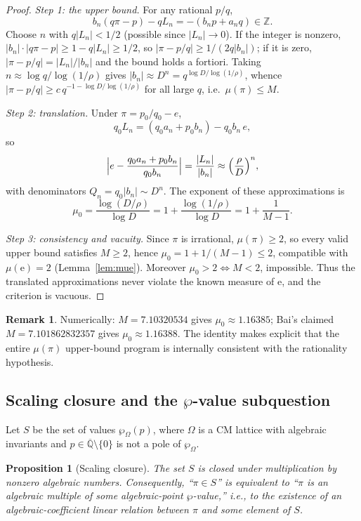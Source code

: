 \documentclass[11pt]{amsart}
\newtheorem{proposition}[theorem]{Proposition}
\theoremstyle{definition}
\newtheorem{remark}[theorem]{Remark}
\theoremstyle{remark}
\numberwithin{equation}{section}
\newcommand{\Z}{\mathbb{Z}}
\newcommand{\Qbar}{\overline{\mathbb{Q}}}
\newcommand{\irr}{\mu}
\newcommand{\ee}{\mathrm{e}}
\begin{document}
\begin{proof}
\emph{Step 1: the upper bound.} For any rational $p/q$,
\[
b_n(q\pi-p)-qL_n=-(b_np+a_nq)\in\Z.
\]
Choose $n$ with $q|L_n|<1/2$ (possible since $|L_n|\to0$). If the integer is nonzero, $|b_n|\cdot|q\pi-p|\ge1-q|L_n|\ge1/2$, so $|\pi-p/q|\ge1/(2q|b_n|)$; if it is zero, $|\pi-p/q|=|L_n|/|b_n|$ and the bound holds a fortiori. Taking $n\approx\log q/\log(1/\rho)$ gives $|b_n|\approx D^n=q^{\log D/\log(1/\rho)}$, whence $|\pi-p/q|\ge c\,q^{-1-\log D/\log(1/\rho)}$ for all large $q$, i.e.\ $\irr(\pi)\le M$.

\emph{Step 2: translation.} Under $\pi=p_0/q_0-e$,
\[
q_0L_n=(q_0a_n+p_0b_n)-q_0b_n\,e,
\]
so
\[
\Bigl|e-\frac{q_0a_n+p_0b_n}{q_0b_n}\Bigr|=\frac{|L_n|}{|b_n|}\approx\Bigl(\frac\rho D\Bigr)^n,
\]
with denominators $Q_n=q_0|b_n|\sim D^n$. The exponent of these approximations is
\[
\irr_0=\frac{\log(D/\rho)}{\log D}=1+\frac{\log(1/\rho)}{\log D}=1+\frac1{M-1}.
\]

\emph{Step 3: consistency and vacuity.} Since $\pi$ is irrational, $\irr(\pi)\ge2$, so every valid upper bound satisfies $M\ge2$, hence $\irr_0=1+1/(M-1)\le2$, compatible with $\irr(\ee)=2$ (Lemma~\ref{lem:mue}). Moreover $\irr_0>2\iff M<2$, impossible. Thus the translated approximations never violate the known measure of $\ee$, and the criterion is vacuous.
\end{proof}

\begin{remark}
Numerically: $M=7.10320534$ gives $\irr_0\approx1.16385$; Bai's claimed $M=7.101862832357$ \cite{Bai2026} gives $\irr_0\approx1.16388$. The identity makes explicit that the entire $\irr(\pi)$ upper-bound program is internally consistent with the rationality hypothesis.
\end{remark}

\subsection{Scaling closure and the \texorpdfstring{$\wp$}{wp}-value subquestion}

Let $S$ be the set of values $\wp_\Omega(p)$, where $\Omega$ is a CM lattice with algebraic invariants and $p\in\Qbar\setminus\{0\}$ is not a pole of $\wp_\Omega$.

\begin{proposition}[Scaling closure]\label{prop:scaling}
The set $S$ is closed under multiplication by nonzero algebraic numbers. Consequently, ``$\pi\in S$'' is equivalent to ``$\pi$ is an algebraic multiple of some algebraic-point $\wp$-value,'' i.e., to the existence of an algebraic-coefficient linear relation between $\pi$ and some element of $S$.
\end{proposition}
\end{document}
